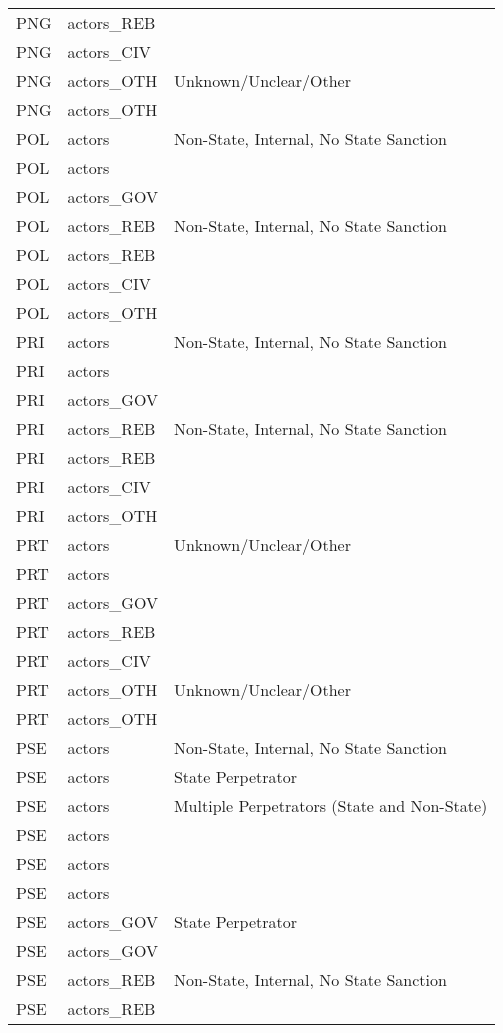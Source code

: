 \begin{table}[ht]
\begin{tabular}{lll}
  PNG & actors\_REB &  \\ 
  PNG & actors\_CIV &  \\ 
  PNG & actors\_OTH & Unknown/Unclear/Other \\ 
  PNG & actors\_OTH &  \\ 
  POL & actors & Non-State, Internal, No State Sanction \\ 
  POL & actors &  \\ 
  POL & actors\_GOV &  \\ 
  POL & actors\_REB & Non-State, Internal, No State Sanction \\ 
  POL & actors\_REB &  \\ 
  POL & actors\_CIV &  \\ 
  POL & actors\_OTH &  \\ 
  PRI & actors & Non-State, Internal, No State Sanction \\ 
  PRI & actors &  \\ 
  PRI & actors\_GOV &  \\ 
  PRI & actors\_REB & Non-State, Internal, No State Sanction \\ 
  PRI & actors\_REB &  \\ 
  PRI & actors\_CIV &  \\ 
  PRI & actors\_OTH &  \\ 
  PRT & actors & Unknown/Unclear/Other \\ 
  PRT & actors &  \\ 
  PRT & actors\_GOV &  \\ 
  PRT & actors\_REB &  \\ 
  PRT & actors\_CIV &  \\ 
  PRT & actors\_OTH & Unknown/Unclear/Other \\ 
  PRT & actors\_OTH &  \\ 
  PSE & actors & Non-State, Internal, No State Sanction \\ 
  PSE & actors & State Perpetrator \\ 
  PSE & actors & Multiple Perpetrators (State and Non-State) \\ 
  PSE & actors &  \\ 
  PSE & actors &  \\ 
  PSE & actors &  \\ 
  PSE & actors\_GOV & State Perpetrator \\ 
  PSE & actors\_GOV &  \\ 
  PSE & actors\_REB & Non-State, Internal, No State Sanction \\ 
  PSE & actors\_REB &  \\ 

\end{tabular}
\end{table}
